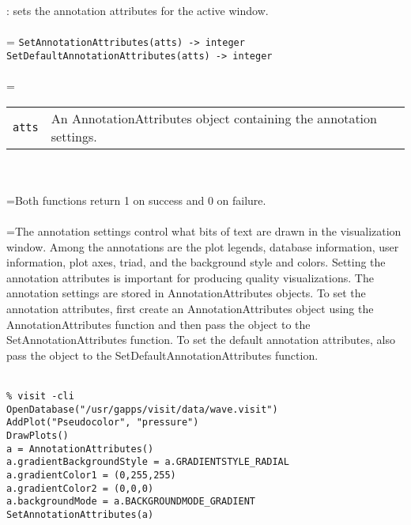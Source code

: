 \documentclass[10pt,a4paper]{report}
\begin{document}
{}
: sets the annotation attributes for the active window.\\[-3mm]

 \\ 
\hangindent=\parindent 
\verb!SetAnnotationAttributes(atts) -> integer!\\ 
\verb!SetDefaultAnnotationAttributes(atts) -> integer!\\ [-3mm]

 \\ 
\hangindent=\parindent 
\begin{tabular}{lp{9cm}}
\verb!atts! & An AnnotationAttributes object containing the annotation settings. \\
\end{tabular} \\[-2mm]


 \\ 
\hangindent=\parindent Both functions return 1 on success and 0 on failure. \\[-3mm] 

 \\ 
\hangindent=\parindent The annotation settings control what bits of text are drawn in the visualization window. Among the annotations are the plot legends, database information, user information, plot axes, triad, and the background style and colors. Setting the annotation attributes is important for producing quality visualizations. The annotation settings are stored in AnnotationAttributes objects. To set the annotation attributes, first create an AnnotationAttributes object using the AnnotationAttributes function and then pass the object to the SetAnnotationAttributes function. To set the default annotation attributes, also pass the object to the SetDefaultAnnotationAttributes function. \\[-3mm] 

\\[-6mm]
\begin{verbatim}% visit -cli
OpenDatabase("/usr/gapps/visit/data/wave.visit")
AddPlot("Pseudocolor", "pressure")
DrawPlots()
a = AnnotationAttributes()
a.gradientBackgroundStyle = a.GRADIENTSTYLE_RADIAL
a.gradientColor1 = (0,255,255)
a.gradientColor2 = (0,0,0)
a.backgroundMode = a.BACKGROUNDMODE_GRADIENT
SetAnnotationAttributes(a)
\end{verbatim}
\newpage
\end{document}
